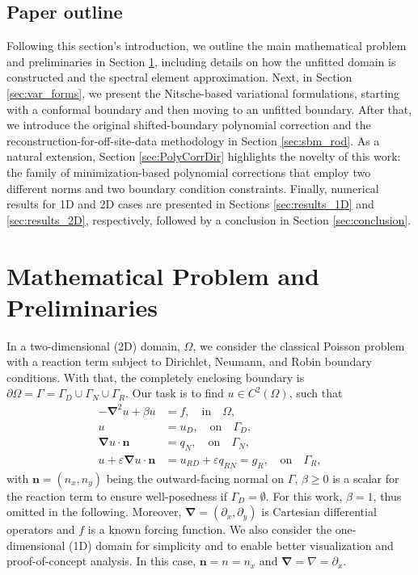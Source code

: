 \documentclass{article}
\begin{document}
\subsection{Paper outline}

Following this section's introduction, we outline the main mathematical problem and preliminaries in Section \ref{sec:math_prop}, including details on how the unfitted domain is constructed and the spectral element approximation. Next, in Section \ref{sec:var_forms}, we present the Nitsche-based variational formulations, starting with a conformal boundary and then moving to an unfitted boundary. After that, we introduce the original shifted-boundary polynomial correction and the reconstruction-for-off-site-data methodology in Section \ref{sec:sbm_rod}. As a natural extension, Section \ref{sec:PolyCorrDir} highlights the novelty of this work: the family of minimization-based polynomial corrections that employ two different norms and two boundary condition constraints. Finally, numerical results for 1D and 2D cases are presented in Sections \ref{sec:results_1D} and \ref{sec:results_2D}, respectively, followed by a conclusion in Section \ref{sec:conclusion}.
\section{Mathematical Problem and Preliminaries}\label{sec:math_prop}

In a two-dimensional (2D) domain, $\Omega$, we consider the classical Poisson problem with a reaction term subject to Dirichlet, Neumann, and Robin boundary conditions. With that, the completely enclosing boundary is $\partial\Omega = \Gamma = \Gamma_D \cup \Gamma_N \cup \Gamma_R$. Our task is to find $u \in C^2(\Omega)$, such that
\begin{subequations} \label{eq:Poisson_strong}
\begin{align} 
        -\boldsymbol{\nabla}^2 u + \beta u  &= f, \quad \text{in} \quad \Omega,  \\
        u  &= u_D, \quad \text{on} \quad \Gamma_D, \\
        \boldsymbol{\nabla} u \cdot \boldsymbol{n}  &= q_N, \quad \text{on} \quad \Gamma_N, \\
         u + \varepsilon \boldsymbol{\nabla} u \cdot \boldsymbol{n}  &= u_{RD}+\varepsilon q_{RN} = g_R,  \quad \text{on} \quad \Gamma_R,
\end{align}
\end{subequations}
with $\boldsymbol{n} = (n_x,n_y)$ being the outward-facing normal on $\Gamma$, $\beta \geq 0$ is a scalar for the reaction term to ensure well-posedness if $\Gamma_D = \emptyset$. For this work, $\beta = 1$, thus omitted in the following. Moreover, $\boldsymbol{\nabla} = (\partial_x,\partial_y)$ is Cartesian differential operators and $f$ is a known forcing function. We also consider the one-dimensional (1D) domain for simplicity and to enable better visualization and proof-of-concept analysis. In this case, $\boldsymbol{n} = n = n_x$ and $\boldsymbol{\nabla} = \nabla = \partial_x$.
\end{document}
